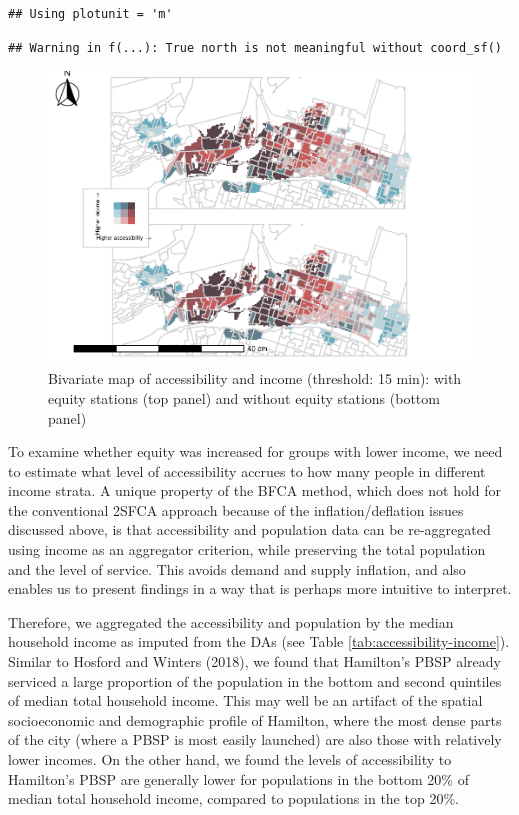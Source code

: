 \documentclass[]{elsarticle} %
\begin{document}
\begin{verbatim}
## Using plotunit = 'm'
\end{verbatim}

\begin{verbatim}
## Warning in f(...): True north is not meaningful without coord_sf()
\end{verbatim}

\begin{figure}
\includegraphics[width=1\linewidth]{Bike-share-spatial-equity_files/figure-latex/figure-bi-map-threshold-15-1} \caption{\label{fig-bivariate-map-threshold-15}Bivariate map of accessibility and income (threshold: 15 min): with equity stations (top panel) and without equity stations (bottom panel)}\label{fig:figure-bi-map-threshold-15}
\end{figure}

To examine whether equity was increased for groups with lower income, we
need to estimate what level of accessibility accrues to how many people
in different income strata. A unique property of the BFCA method, which
does not hold for the conventional 2SFCA approach because of the
inflation/deflation issues discussed above, is that accessibility and
population data can be re-aggregated using income as an aggregator
criterion, while preserving the total population and the level of
service. This avoids demand and supply inflation, and also enables us to
present findings in a way that is perhaps more intuitive to interpret.

Therefore, we aggregated the accessibility and population by the median
household income as imputed from the DAs (see Table
\ref{tab:accessibility-income}). Similar to Hosford and Winters (2018),
we found that Hamilton's PBSP already serviced a large proportion of the
population in the bottom and second quintiles of median total household
income. This may well be an artifact of the spatial socioeconomic and
demographic profile of Hamilton, where the most dense parts of the city
(where a PBSP is most easily launched) are also those with relatively
lower incomes. On the other hand, we found the levels of accessibility
to Hamilton's PBSP are generally lower for populations in the bottom
20\% of median total household income, compared to populations in the
top 20\%.
\end{document}
